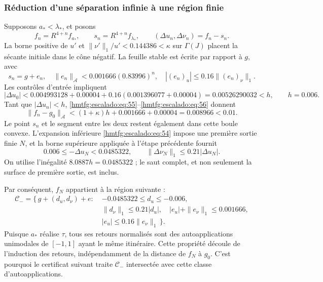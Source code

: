 \subsubsection{Réduction d’une séparation infinie à une région finie}
\label{hmtfg:escalado:16.2}

Supposons \(a_*<\lambda_*\), et posons
\[
f_n=R^{4+n}f_{a_*},\qquad
s_n=R^{4+n}f_{\lambda_*},\qquad
(\Delta u_n,\Delta\nu_n)=f_n-s_n.
\]
La borne positive de \(u'\) et \(\|\nu'\|_1/u'<0.144386<\kappa\) sur \(\Gamma(J)\) placent la sécante initiale dans le cône négatif. La feuille stable est écrite par rapport à \(g\), avec
\begin{equation}
s_n=g+e_n,\quad
\|e_n\|_{\mathcal A}<0.001666(0.83996)^n,\quad
|(e_n)_u|\le0.16\|(e_n)_\nu\|_1.
\label{hmtfg:escalado:eq:56}
\end{equation}
Les contrôles d’entrée impliquent
\begin{equation}
|\Delta u_0|
<0.004993128+0.00004
 +0.16(0.001396077+0.00004)
=0.00526290032< h,\qquad h=0.006.
\label{hmtfg:escalado:eq:57}
\end{equation}
Tant que \(|\Delta u_n|<h\), \eqref{hmtfg:escalado:eq:55}–\eqref{hmtfg:escalado:eq:56} donnent
\begin{equation}
\|f_n-g_0\|_{\mathcal A}
<(1+\kappa)h+0.001666+0.00004
=0.008966<0.01.
\label{hmtfg:escalado:eq:58}
\end{equation}
Le point \(s_n\) et le segment entre les deux restent également dans cette boule convexe. L’expansion inférieure \eqref{hmtfg:escalado:eq:54} impose une première sortie finie \(N\), et la borne supérieure appliquée à l’étape précédente fournit
\begin{equation}
0.006\le-\Delta u_N<0.0485322,\qquad
\|\Delta\nu_N\|_1\le0.21|\Delta u_N|.
\label{hmtfg:escalado:eq:59}
\end{equation}
On utilise l’inégalité \(8.0887h=0.0485322\) ; le saut complet, et non seulement la surface de première sortie, est inclus.

Par conséquent, \(f_N\) appartient à la région suivante :
\begin{equation}
\begin{split}
\mathcal C_-=\{\,g+(d_u,d_\nu)+e:\;&
-0.0485322\le d_u\le-0.006,\\
&\|d_\nu\|_1\le0.21|d_u|,\quad
|e_u|+\|e_\nu\|_1\le0.001666,\\
&|e_u|\le0.16\|e_\nu\|_1\,\}.
\end{split}
\label{hmtfg:escalado:eq:60}
\end{equation}
Puisque \(a_*\) réalise \(\tau\), tous ses retours normalisés sont des autoapplications unimodales de \([-1,1]\) ayant le même itinéraire. Cette propriété découle de l’induction des retours, indépendamment de la distance de \(f_N\) à \(g_0\). C’est pourquoi le certificat suivant traite \(\mathcal C_-\) intersectée avec cette classe d’autoapplications.

